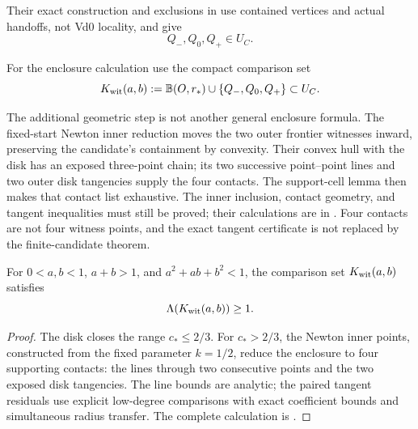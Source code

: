Their exact construction and exclusions in
 use contained vertices and actual handoffs, not
Vd0 locality, and give
\begin{equation}
 Q_-,Q_0,Q_+\in U_C.
 \label{eq:reader-forced-asymmetric}
\end{equation}

For the enclosure calculation use the compact comparison set
\begin{equation}
 K_{\rm wit}(a,b):=
 \mathbb B(O,r_*)\cup\{Q_-,Q_0,Q_+\}
 \subset U_C.
 \label{eq:reader-witness-set}
\end{equation}





The additional geometric step is not another general enclosure
formula. The fixed-start Newton inner reduction moves the two outer frontier
witnesses inward, preserving the candidate's containment by convexity.
Their convex hull with the disk has an exposed three-point chain;
its two successive point--point lines and two outer disk tangencies
supply the four contacts. The support-cell lemma then makes that
contact list exhaustive. The inner inclusion, contact geometry, and
tangent inequalities must still be proved; their calculations are in
. Four contacts are not four
witness points, and the exact tangent certificate is not replaced by
the finite-candidate theorem.


\begin{theorem}
\label{thm:reader-witness-enclosure}
For $0<a,b<1$, $a+b>1$, and $a^2+ab+b^2<1$, the comparison set
$K_{\rm wit}(a,b)$ satisfies
\[
 \Lambda(K_{\rm wit}(a,b))\ge1.
\]
\end{theorem}

\begin{proof}
The disk closes the range \(c_*\le2/3\).  For \(c_*>2/3\), the Newton inner
points, constructed from the fixed parameter $k=1/2$, reduce the enclosure to four supporting contacts: the lines through
two consecutive points and the two exposed disk tangencies. The line bounds
are analytic; the paired tangent residuals use explicit low-degree comparisons with exact
coefficient bounds and simultaneous radius transfer.  The complete calculation is
.
\end{proof}


